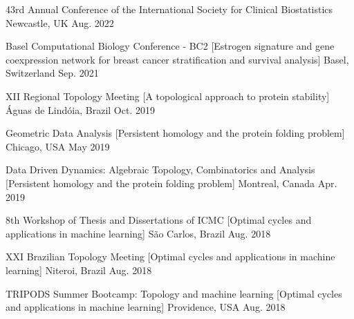
\begin{cvhonors}

\cvhonor
  {43rd Annual Conference of the International Society for Clinical Biostatistics} %
  {Newcastle, UK} %
  {Aug. 2022} %

\cvhonor
  {Basel Computational Biology Conference - BC2} %
  [Estrogen signature and gene coexpression network for breast cancer stratification and survival analysis] %
  {Basel, Switzerland} %
  {Sep. 2021} %



\cvhonor
  {XII Regional Topology Meeting} %
  [A topological approach to protein stability] %
  {Águas de Lindóia, Brazil} %
  {Oct. 2019} %


\cvhonor
  {Geometric Data Analysis} %
  [Persistent homology and the protein folding problem] %
  {Chicago, USA} %
  {May 2019} %

\cvhonor
  {Data Driven Dynamics: Algebraic Topology, Combinatorics and Analysis} %
  [Persistent homology and the protein folding problem] %
  {Montreal, Canada} %
  {Apr. 2019} %

\cvhonor
  {8th Workshop of Thesis and Dissertations of ICMC} %
  [Optimal cycles and applications in machine learning] %
  {São Carlos, Brazil} %
  {Aug. 2018} %

\cvhonor
  {XXI Brazilian Topology Meeting} %
  [Optimal cycles and applications in machine learning] %
  {Niteroi, Brazil} %
  {Aug. 2018} %

\cvhonor
  {TRIPODS Summer Bootcamp: Topology and machine learning} %
  [Optimal cycles and applications in machine learning] %
  {Providence, USA} %
  {Aug. 2018} %


\end{cvhonors}
